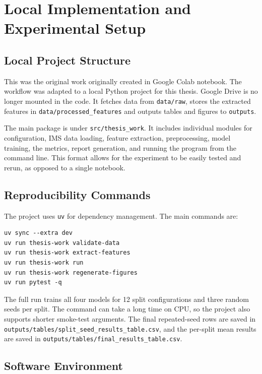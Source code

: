 ﻿\chapter{Local Implementation and Experimental Setup}
\label{chapter:implementation}

\section{Local Project Structure}
This was the original work originally created in Google Colab notebook. The workflow was adapted to a local Python project for this thesis. Google Drive is no longer mounted in the code. It fetches data from \texttt{data/raw}, stores the extracted features in \texttt{data/processed\_features} and outputs tables and figures to \texttt{outputs}.

The main package is under \texttt{src/thesis\_work}. It includes individual modules for configuration, IMS data loading, feature extraction, preprocessing, model training, the metrics, report generation, and running the program from the command line. This format allows for the experiment to be easily tested and rerun, as opposed to a single notebook.

\section{Reproducibility Commands}

The project uses \texttt{uv} for dependency management. The main commands are:

\begin{verbatim}
uv sync --extra dev
uv run thesis-work validate-data
uv run thesis-work extract-features
uv run thesis-work run
uv run thesis-work regenerate-figures
uv run pytest -q
\end{verbatim}

The full run trains all four models for 12 split configurations and three random seeds per split. The command can take a long time on CPU, so the project also supports shorter smoke-test arguments. The final repeated-seed rows are saved in \texttt{outputs/tables/split\_seed\_results\_table.csv}, and the per-split mean results are saved in \texttt{outputs/tables/final\_results\_table.csv}.

\section{Software Environment}


